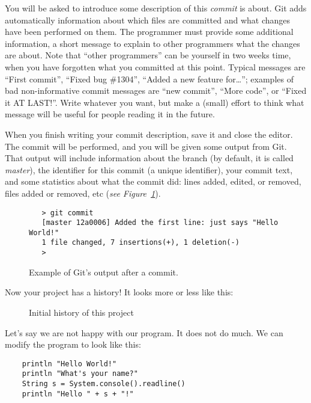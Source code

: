 You will be asked to introduce some description of this \emph{commit}
is about. Git adds automatically information about which files are
committed and what changes have been performed on them. The programmer
must provide some additional information, a short message to explain
to other programmers what the changes are about. Note that ``other
programmers'' can be yourself in two weeks time, when you have
forgotten what you committed at this point. Typical messages are
``First commit'', ``Fixed bug \#1304'', ``Added a new feature
for\ldots''; examples of bad non-informative commit messages are ``new
commit'', ``More code'', or ``Fixed it AT LAST!''. Write whatever you
want, but make a (small) effort to think what message will be useful
for people reading it in the future.

When you finish writing your commit description, save it and close the
editor. The commit will be performed, and you will be given some
output from Git. That output will include information about the
branch (by default, it is called \emph{master}), the identifier for
this commit (a unique identifier), your commit text, and some 
statistics about what the commit did: lines added, edited, or removed,
files added or removed, etc (\emph{see
  Figure~\ref{fig:git-example-1}}). 

\begin{figure}[htbp!]
  \centering
  \begin{framed}
    \begin{verbatim}
   > git commit
   [master 12a0006] Added the first line: just says "Hello World!"
   1 file changed, 7 insertions(+), 1 deletion(-)
   >
   \end{verbatim}
  \end{framed}
  \caption{Example of Git's output after a commit.}
  \label{fig:git-example-1}
\end{figure}

Now your project has a history! It looks more or less like this:

\begin{figure}[htbp!]
  \centering
  \caption{Initial history of this project}
  \label{fig:git-example-2}
\end{figure}

Let's say we are not happy with our program. It does not do much. We
can modify the program to look like this:

\begin{verbatim}
    println "Hello World!"
    println "What's your name?"
    String s = System.console().readline()
    println "Hello " + s + "!"
\end{verbatim}

